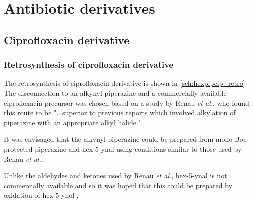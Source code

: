 \section{Antibiotic derivatives}

\subsection{Ciprofloxacin derivative}




\subsubsection{Retrosynthesis of ciprofloxacin derivative }

The retrosynthesis of ciprofloxacin derivative  is shown in \ref{sch:hexpipcip_retro}. The disconnection to an alkynyl piperazine  and a commercially available ciprofloxacin precursor  was chosen based on a study by Renau \textit{et al.}, who found this route to be "...superior to previous reports which involved alkylation of piperazine with an appropriate alkyl halide." \cite{Renau1996,JPS:JPS2600571210}. 

It was envisaged that the alkynyl piperazine  could be prepared from mono-Boc-protected piperazine  and hex-5-ynal  using conditions similar to those used by Renau \textit{et al.}\cite{Renau1996}.

Unlike the aldehydes and ketones used by Renau \textit{et al.}\cite{Renau1996}, hex-5-ynal  is not commercially available and so it was hoped that this could be prepared by oxidation of hex-5-ynol .

